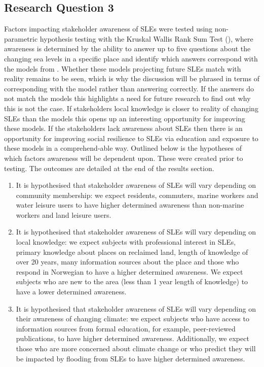 \subsection{Research Question 3}
Factors  impacting stakeholder awareness of SLEs were tested using non-parametric hypothesis testing with the Kruskal Wallis Rank Sum Test (\cite{hollander_nonparametric_2014}), where awareness is determined by the ability to answer up to five questions about the changing sea levels in a specific place and identify which answers correspond with the models from \cite{kartverket_se_2021}. Whether these models projecting future SLEs match with reality remains to be seen, which is why the discussion will be phrased in terms of corresponding with the model rather than answering correctly. If the answers do not match the models this highlights a need for future research to find out why this is not the case. If stakeholders local knowledge is closer to reality of changing SLEs than the models this opens up an interesting opportunity for improving these models. If the stakeholders lack awareness about SLEs then there is an opportunity for improving social resilience to SLEs via education and exposure to these models in a comprehend-able way. Outlined below is the hypotheses of which factors awareness will be dependent upon. These were created prior to testing. The outcomes are detailed at the end of the results section. 

\begin{enumerate}
    \item It is hypothesised that stakeholder awareness of SLEs will vary depending on community membership: we expect residents, commuters, marine workers and water leisure users to have higher determined awareness than non-marine workers and land leisure users.
  
    \item It is hypothesised that stakeholder awareness of SLEs will vary depending on local knowledge: we expect subjects with professional interest in SLEs,  primary knowledge about places on reclaimed land, length of knowledge of over 20 years, many information sources about the place and those who respond in Norwegian to have a higher determined awareness. We expect subjects who are new to the area (less than 1 year length of knowledge) to have a lower determined awareness.

    \item It is hypothesised that stakeholder awareness of SLEs will vary depending on their awareness of changing climate: we expect subjects who have access to information sources from formal education, for example, peer-reviewed publications, to have higher determined awareness. Additionally, we expect those who are more concerned about climate change or who predict they will be impacted by flooding from SLEs to have higher determined awareness. 
\end{enumerate}

